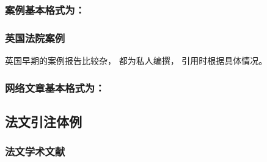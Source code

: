 \documentclass{article}
\begin{document}
\begin{refsegment}
\nocite{molc.82:01,molc.82:02}

\printbibliography[heading=none,segment=12]
\end{refsegment}


\subsubsection{案例基本格式为：}

\begin{refsegment}
\nocite{molc.83:01-1,molc.83:01-2,molc.83:02,molc.83:03}

\printbibliography[heading=none,segment=13]
\end{refsegment}


\subsubsection{英国法院案例}
英国早期的案例报告比较杂， 都为私人编撰， 引用时根据具体情况。



\subsubsection{网络文章基本格式为：}

\begin{refsegment}
\nocite{molc.85:01}

\printbibliography[heading=none,segment=14]
\end{refsegment}


\subsection{法文引注体例}

\subsubsection{法文学术文献}

\begin{quotation}






\end{quotation}
\end{document}
